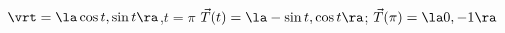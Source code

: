 {$\vrt = \la \cos t, \sin t \ra$,\quad $t=\pi$ \label{11_04_ex_08}
}
{$\vec T(t) = \la -\sin t,\cos t\ra$; 
$\vec T(\pi) = \la 0,-1\ra$
}
